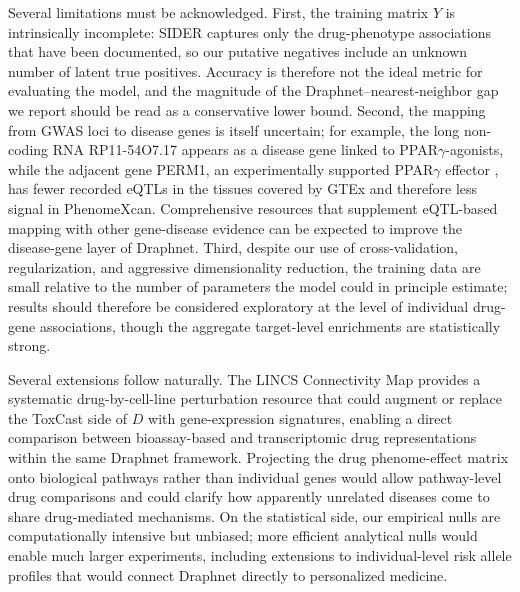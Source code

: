 \documentclass[11pt]{article}
\begin{document}
Several limitations must be acknowledged. First, the training matrix
$Y$ is intrinsically incomplete: SIDER captures only the drug-phenotype
associations that have been documented, so our putative negatives
include an unknown number of latent true positives. Accuracy is
therefore not the ideal metric for evaluating the model, and the
magnitude of the Draphnet--nearest-neighbor gap we report should be
read as a conservative lower bound. Second, the mapping from GWAS loci
to disease genes is itself uncertain; for example, the long non-coding
RNA RP11-54O7.17 appears as a disease gene linked to
PPAR$\gamma$-agonists, while the adjacent gene PERM1, an experimentally
supported PPAR$\gamma$ effector \citep{huang2022perm1}, has fewer
recorded eQTLs in the tissues covered by GTEx \citep{gtex2020atlas} and
therefore less signal in PhenomeXcan. Comprehensive resources that
supplement eQTL-based mapping with other gene-disease evidence can be
expected to improve the disease-gene layer of Draphnet. Third, despite
our use of cross-validation, regularization, and aggressive
dimensionality reduction, the training data are small relative to the
number of parameters the model could in principle estimate; results
should therefore be considered exploratory at the level of individual
drug-gene associations, though the aggregate target-level enrichments
are statistically strong.

Several extensions follow naturally. The LINCS Connectivity Map
\citep{subramanian2017lincs} provides a systematic drug-by-cell-line
perturbation resource that could augment or replace the ToxCast side
of $D$ with gene-expression signatures, enabling a direct comparison
between bioassay-based and transcriptomic drug representations within
the same Draphnet framework. Projecting the drug phenome-effect
matrix onto biological pathways rather than individual genes would
allow pathway-level drug comparisons and could clarify how apparently
unrelated diseases come to share drug-mediated mechanisms. On the
statistical side, our empirical nulls are computationally intensive
but unbiased; more efficient analytical nulls would enable much larger
experiments, including extensions to individual-level risk allele
profiles that would connect Draphnet directly to personalized
medicine.
\end{document}
